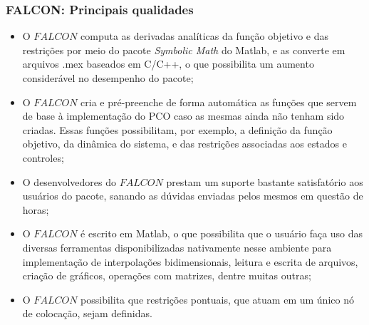 \subsubsection{FALCON: Principais qualidades}
\begin{itemize}
	\item O $FALCON$ computa as derivadas analíticas da função objetivo e das restrições por meio do pacote \textit{Symbolic Math} do Matlab\textsuperscript{\textregistered}, e as converte em arquivos .mex baseados em C/C++, o que possibilita um aumento considerável no desempenho do pacote;
	
	\item O $FALCON$ cria e pré-preenche de forma automática as funções que servem de base à implementação do PCO caso as mesmas ainda não tenham sido criadas. Essas funções possibilitam, por exemplo, a definição da função objetivo, da dinâmica do sistema, e das restrições associadas aos estados e controles;
	
	\item O desenvolvedores do $FALCON$ prestam um suporte bastante satisfatório aos usuários do pacote, sanando as dúvidas enviadas pelos mesmos em questão de horas;
	
	\item O $FALCON$ é escrito em Matlab\textsuperscript{\textregistered}, o que possibilita que o usuário faça uso das diversas ferramentas disponibilizadas nativamente nesse ambiente para implementação de interpolações bidimensionais, leitura e escrita de arquivos, criação de gráficos, operações com matrizes, dentre muitas outras;
	
	\item O $FALCON$ possibilita que restrições pontuais, que atuam em um único nó de colocação, sejam definidas.
\end{itemize}

